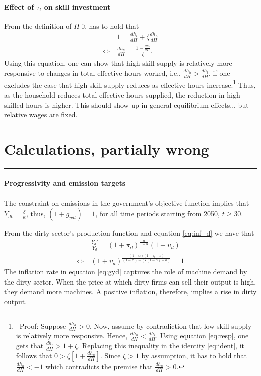 \paragraph{Effect of $\tau_l$ on skill investment}
From the definition of $H$ it has to hold that 
\begin{align}
&1=\frac{dh_l}{dH}+\zeta \frac{dh_h}{dH}\label{eq:ident} \\
\Leftrightarrow\ & \frac{dh_h}{dH}=\frac{1-\frac{dh_l}{dH}}{\zeta}.\label{eq:resp}
\end{align}
Using this equation, one can show that high skill supply is relatively more responsive to changes in total effective hours worked, i.e.,  $\frac{dh_h}{dH}>\frac{dh_l}{dH}$, if one excludes the case that high skill supply reduces as effective hours increase.\footnote{\ Proof: Suppose   $\frac{dh_h}{dH}>0$. Now, assume by contradiction that low skill supply is relatively more responsive. Hence, $\frac{dh_h}{dH}<\frac{dh_l}{dH}$. Using equation \ref{eq:resp}, one gets that $\frac{dh_l}{dH}>1+\zeta$. Replacing this inequality in the identity \ref{eq:ident}, it follows that $0>\zeta[1+\frac{dh_h}{dH}]$. Since $\zeta>1$ by assumption, it has to hold that $\frac{dh_h}{dH}<-1$ which contradicts the premise that $\frac{dh_h}{dH}>0$. } Thus, as the household reduces total effective hours supplied, the reduction in high skilled hours is higher.  This should show up in general equilibrium effects... but relative wages are fixed. 


\section{Calculations, partially wrong}
\noindent\rule[1ex]{\textwidth}{1pt}

\paragraph{Progressivity and emission targets}
The constraint on emissions in the government's objective function implies that $Y_{dt}=\frac{\delta}{\kappa}$, thus, $(1+g_{ydt})=1$, for all time periods starting from 2050, $t\geq 30$. 

From the dirty sector's production function and equation \ref{eq:inf_d} we have that
\begin{align}
&\frac{Y_{d}'}{Y_d}=(1+\pi_d)^{\frac{\alpha}{1-\alpha}}(1+\upsilon_{d})\label{eq:gyd}\\
\Leftrightarrow\ &(1+\upsilon_{d})^{\frac{(1-\alpha)(1-\tau_l-\varepsilon)}{(1-\tau_l)-(\varepsilon(1-\alpha)+\alpha)}}=1\label{eq:def_taul}
\end{align}
The inflation rate in equation \ref{eq:gyd} captures the role of machine demand by the dirty sector. When the price at which dirty firms can sell their output is high, they demand more machines. A positive inflation, therefore, implies a rise in dirty output.


